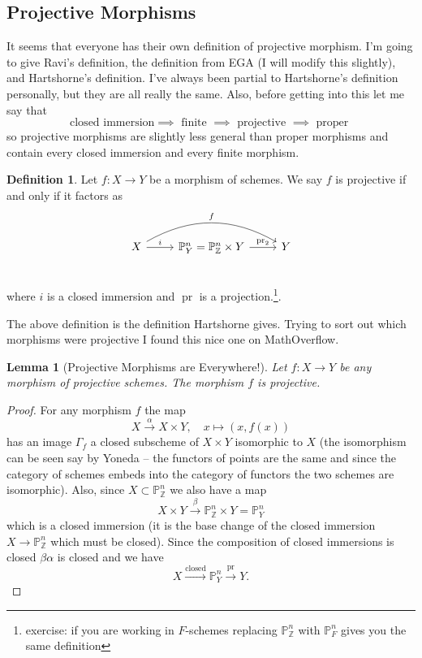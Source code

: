 \documentclass[12pt]{article}
\numberwithin{equation}{section}
\newtheorem{lemma}[theorem]{Lemma}
\theoremstyle{definition}
\newtheorem{definition}[theorem]{Definition}
\theoremstyle{remark}
\newcommand{\ZZ}{\mathbb{Z}}
\newcommand{\PP}{\mathbb{P}}
\newcommand{\pr}{\operatorname{pr}}
\begin{document}
\subsection{Projective Morphisms}

It seems that everyone has their own definition of projective morphism.
I'm going to give Ravi's definition, the definition from EGA (I will modify this slightly), and Hartshorne's definition. 
I've always been partial to Hartshorne's definition personally, but they are all really the same.
Also, before getting into this let me say that 
 $$ \mbox{closed immersion} \implies \mbox{ finite } \implies \mbox{ projective } \implies \mbox{ proper } $$
so projective morphisms are slightly less general than proper morphisms and contain every closed immersion and every finite morphism.

\begin{definition}
Let $f:X\to Y$ be a morphism of schemes. We say $f$ is projective if and only if it factors as
	 $$ \begin{tikzcd}
	 X \ar[r,"i"] \ar[rr,bend left, "f"] & \PP^n_Y = \PP^n_{\ZZ}\times Y \ar[r, "\pr_2"] & Y \\
	\end{tikzcd}
	$$
	where $i$ is a closed immersion and $\pr$ is a projection.\footnote{ exercise: if you are working in $F$-schemes replacing $\PP^n_{\ZZ}$ with $\PP^n_F$ gives you the same definition}.
\end{definition}
The above definition is the definition Hartshorne gives. 
Trying to sort out which morphisms were projective I found this nice one on MathOverflow. 
\begin{lemma}[Projective Morphisms are Everywhere!]
	Let $f:X\to Y$ be any morphism of projective schemes.
	The morphism $f$ is projective.
\end{lemma}
\begin{proof}
	For any morphism $f$ the map 
	$$ X \xrightarrow{\alpha} X\times Y, \quad x\mapsto (x,f(x)) $$ 
	has an image $\Gamma_f$ a closed subscheme of $X\times Y$ isomorphic to $X$ (the isomorphism can be seen say by Yoneda -- the functors of points are the same and since the category of schemes embeds into the category of functors the two schemes are isomorphic).
	Also, since $X\subset \PP^n_{\ZZ}$ we also have a map 
	$$ X\times Y \xrightarrow{\beta} \PP^n_{\ZZ}\times Y = \PP^n_Y $$
	which is a closed immersion (it is the base change of the closed immersion $X\to \PP^n_{\ZZ}$ which must be closed).
	Since the composition of closed immersions is closed $\beta \alpha$ is closed and we have 
	$$ X \xrightarrow{\mbox{closed}} \PP^n_Y \xrightarrow{\pr} Y. $$
\end{proof}
\end{document}
